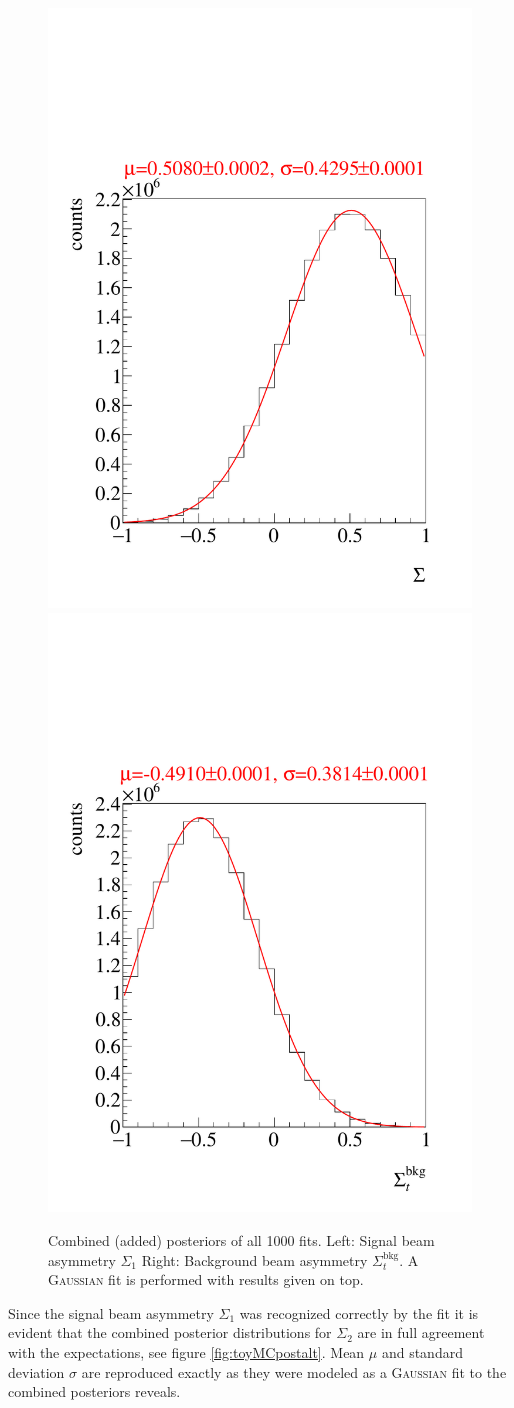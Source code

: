 \begin{figure}[htbp]
	\centering
	\includegraphics[width=.49\linewidth]{../bayes/etap_event_based_fit/plots/combined_post_add_raw.pdf}
	\includegraphics[width=.49\linewidth]{../bayes/etap_event_based_fit/plots/combined_post_add_raw_bkg.pdf}
	\caption{Combined (added) posteriors of all 1000 fits. Left: Signal beam asymmetry $\Sigma_1$ Right: Background beam asymmetry $\Sigma_t^\text{bkg}$. A \textsc{Gaussian} fit is performed with results given on top.}
	\label{fig:toyMCpost}
\end{figure}
Since the signal beam asymmetry $\Sigma_1$ was recognized correctly by the fit it is evident that the combined posterior distributions for $\Sigma_2$ are in full agreement with the expectations, see figure \ref{fig:toyMCpostalt}. Mean $\mu$ and standard deviation $\sigma$ are reproduced exactly as they were modeled as a \textsc{Gaussian} fit to the combined posteriors reveals.
